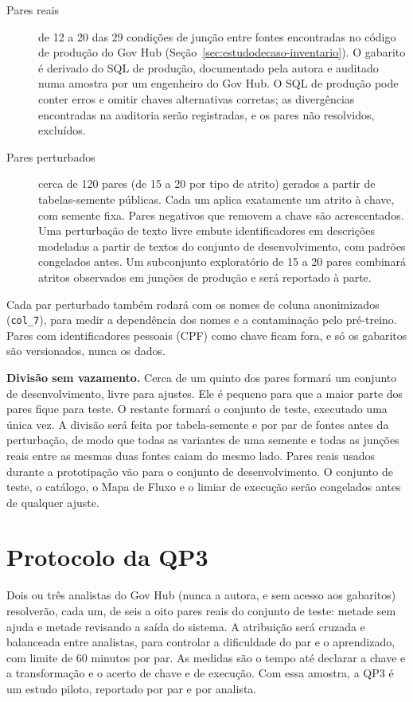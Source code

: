 \begin{description}
\item[Pares reais] de 12 a 20 das 29 condições de junção entre fontes
encontradas no código de produção do Gov Hub
(Seção~\ref{sec:estudodecaso-inventario}). O gabarito é derivado do SQL de
produção, documentado pela autora e auditado numa amostra por um engenheiro
do Gov Hub. O SQL de produção pode conter erros e omitir chaves alternativas
corretas; as divergências encontradas na auditoria serão registradas, e os
pares não resolvidos, excluídos.
\item[Pares perturbados] cerca de 120 pares (de 15 a 20 por tipo de atrito)
gerados a partir de tabelas-semente públicas. Cada um aplica exatamente um
atrito à chave, com semente fixa. Pares negativos que removem a chave são
acrescentados. Uma perturbação de texto livre embute identificadores em
descrições modeladas a partir de textos do conjunto de desenvolvimento, com
padrões congelados antes. Um subconjunto exploratório de 15 a 20 pares
combinará atritos observados em junções de produção e será reportado à
parte.
\end{description}

Cada par perturbado também rodará com os nomes de coluna anonimizados
(\texttt{col\_7}), para medir a dependência dos nomes e a contaminação pelo
pré-treino. Pares com identificadores pessoais (CPF) como chave ficam fora, e
só os gabaritos são versionados, nunca os dados.

\textbf{Divisão sem vazamento.} Cerca de um quinto dos pares formará um
conjunto de desenvolvimento, livre para ajustes. Ele é pequeno para que a
maior parte dos pares fique para teste. O restante formará o conjunto de
teste, executado uma única vez. A divisão será feita por tabela-semente e
por par de fontes antes da perturbação, de modo que todas as variantes de uma
semente e todas as junções reais entre as mesmas duas fontes caiam do mesmo
lado. Pares reais usados durante a prototipação vão para o conjunto de
desenvolvimento. O conjunto de teste, o catálogo, o Mapa de Fluxo e o limiar
de execução serão congelados antes de qualquer ajuste.

\section{Protocolo da QP3}
\label{sec:metodologia-protocolo-qp3}

Dois ou três analistas do Gov Hub (nunca a autora, e sem acesso aos
gabaritos) resolverão, cada um, de seis a oito pares reais do conjunto de
teste: metade sem ajuda e metade revisando a saída do sistema. A atribuição
será cruzada e balanceada entre analistas, para controlar a dificuldade do
par e o aprendizado, com limite de 60 minutos por par. As medidas são o tempo
até declarar a chave e a transformação e o acerto de chave e de execução. Com
essa amostra, a QP3 é um estudo piloto, reportado por par e por analista.

